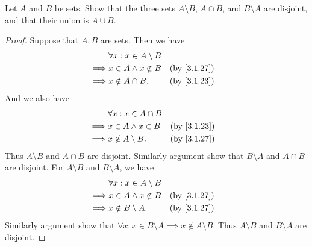 \begin{ex}\label{ex:3.1.10}
	Let \(A\) and \(B\) be sets.
	Show that the three sets \(A \setminus B\), \(A \cap B\), and \(B \setminus A\) are disjoint, and that their union is \(A \cup B\).
\end{ex}

\begin{proof}
	Suppose that \(A, B\) are sets.
	Then we have
	\begin{align*}
		         & \forall x : x \in A \setminus B                  \\
		\implies & x \in A \land x \notin B        &  & \by{3.1.27} \\
		\implies & x \notin A \cap B.              &  & \by{3.1.23}
	\end{align*}
	And we also have
	\begin{align*}
		         & \forall x : x \in A \cap B                  \\
		\implies & x \in A \land x \in B      &  & \by{3.1.23} \\
		\implies & x \notin A \setminus B.    &  & \by{3.1.27}
	\end{align*}
	Thus \(A \setminus B\) and \(A \cap B\) are disjoint.
	Similarly argument show that \(B \setminus A\) and \(A \cap B\) are disjoint.
	For \(A \setminus B\) and \(B \setminus A\), we have
	\begin{align*}
		         & \forall x : x \in A \setminus B                  \\
		\implies & x \in A \land x \notin B        &  & \by{3.1.27} \\
		\implies & x \notin B \setminus A.         &  & \by{3.1.27}
	\end{align*}
	Similarly argument show that \(\forall x : x \in B \setminus A \implies x \notin A \setminus B\).
	Thus \(A \setminus B\) and \(B \setminus A\) are disjoint.


\end{proof}

